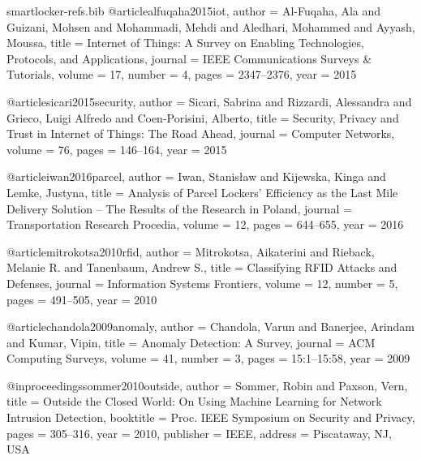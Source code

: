 \begin{filecontents*}[overwrite]{smartlocker-refs.bib}
@article{alfuqaha2015iot,
  author  = {Al-Fuqaha, Ala and Guizani, Mohsen and Mohammadi, Mehdi and Aledhari, Mohammed and Ayyash, Moussa},
  title   = {Internet of Things: A Survey on Enabling Technologies, Protocols, and Applications},
  journal = {IEEE Communications Surveys \& Tutorials},
  volume  = {17},
  number  = {4},
  pages   = {2347--2376},
  year    = {2015}
}

@article{sicari2015security,
  author  = {Sicari, Sabrina and Rizzardi, Alessandra and Grieco, Luigi Alfredo and Coen-Porisini, Alberto},
  title   = {Security, Privacy and Trust in {Internet of Things}: The Road Ahead},
  journal = {Computer Networks},
  volume  = {76},
  pages   = {146--164},
  year    = {2015}
}

@article{iwan2016parcel,
  author  = {Iwan, Stanis{\l}aw and Kijewska, Kinga and Lemke, Justyna},
  title   = {Analysis of Parcel Lockers' Efficiency as the Last Mile Delivery Solution -- The Results of the Research in {Poland}},
  journal = {Transportation Research Procedia},
  volume  = {12},
  pages   = {644--655},
  year    = {2016}
}

@article{mitrokotsa2010rfid,
  author  = {Mitrokotsa, Aikaterini and Rieback, Melanie R. and Tanenbaum, Andrew S.},
  title   = {Classifying {RFID} Attacks and Defenses},
  journal = {Information Systems Frontiers},
  volume  = {12},
  number  = {5},
  pages   = {491--505},
  year    = {2010}
}

@article{chandola2009anomaly,
  author  = {Chandola, Varun and Banerjee, Arindam and Kumar, Vipin},
  title   = {Anomaly Detection: A Survey},
  journal = {ACM Computing Surveys},
  volume  = {41},
  number  = {3},
  pages   = {15:1--15:58},
  year    = {2009}
}

@inproceedings{sommer2010outside,
  author    = {Sommer, Robin and Paxson, Vern},
  title     = {Outside the Closed World: On Using Machine Learning for Network Intrusion Detection},
  booktitle = {Proc. IEEE Symposium on Security and Privacy},
  pages     = {305--316},
  year      = {2010},
  publisher = {IEEE},
  address   = {Piscataway, NJ, USA}
}


\end{filecontents*}
